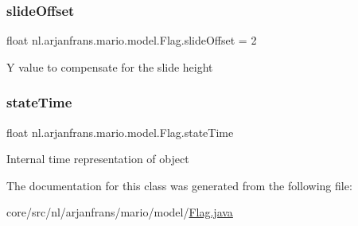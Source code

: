 \subsubsection{\texorpdfstring{slide\+Offset}{slideOffset}}
{\footnotesize\ttfamily float nl.\+arjanfrans.\+mario.\+model.\+Flag.\+slide\+Offset = 2\hspace{0.3cm}{\ttfamily [private]}}

Y value to compensate for the slide height \mbox{\label{classnl_1_1arjanfrans_1_1mario_1_1model_1_1Flag_adef15ac263403cee29a647f402a49167}} 
\subsubsection{\texorpdfstring{state\+Time}{stateTime}}
{\footnotesize\ttfamily float nl.\+arjanfrans.\+mario.\+model.\+Flag.\+state\+Time\hspace{0.3cm}{\ttfamily [private]}}

Internal time representation of object 

The documentation for this class was generated from the following file\+:\begin{DoxyCompactItemize}
\item 
core/src/nl/arjanfrans/mario/model/\hyperlink{Flag_8java}{Flag.\+java}\end{DoxyCompactItemize}
